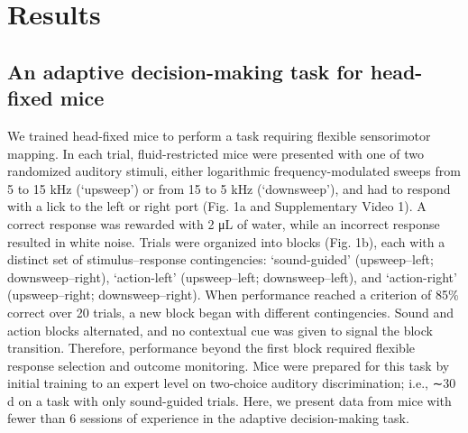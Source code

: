\section{Results}

\subsection{An adaptive decision-making task for head-fixed mice}

We trained head-fixed mice to perform a task requiring flexible sensorimotor mapping. In each trial, fluid-restricted mice were presented with one of two randomized auditory stimuli, either logarithmic frequency-modulated sweeps from 5 to 15 kHz (`upsweep') or from 15 to 5 kHz (`downsweep'), and had to respond with a lick to the left or right port (Fig. 1a and Supplementary Video 1). A correct response was rewarded with 2 \unit{\micro\liter} of water, while an incorrect response resulted in white noise. Trials were organized into blocks (Fig. 1b), each with a distinct set of stimulus–response contingencies: `sound-guided' (upsweep–left; downsweep–right), `action-left' (upsweep–left; downsweep–left), and `action-right' (upsweep–right; downsweep–right). When performance reached a criterion of 85\% correct over 20 trials, a new block began with different contingencies. Sound and action blocks alternated, and no contextual cue was given to signal the block transition. Therefore, performance beyond the first block required flexible response selection and outcome monitoring. Mice were prepared for this task by initial training to an expert level on two-choice auditory discrimination; i.e., ∼30 d on a task with only sound-guided trials. Here, we present data from mice with fewer than 6 sessions of experience in the adaptive decision-making task.



